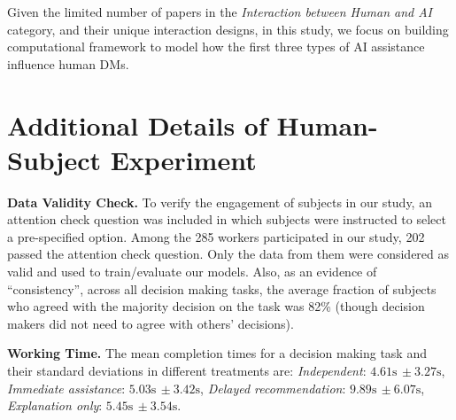 \documentclass[letterpaper]{article} %
\begin{document}
Given the limited number of papers in the \emph{Interaction between Human and AI} category, and their unique interaction designs, in this study, we focus on building computational framework to model how the first three types of AI assistance influence human DMs. 


\section{Additional Details of Human-Subject Experiment}
\noindent \textbf{Data Validity Check.} To verify the engagement of subjects in our study, an attention check question was included in which subjects were instructed to select a pre-specified option. Among the 285 workers participated in our study, 202 passed the attention check question. Only the data from them were considered as valid and used to train/evaluate our models. Also, as an evidence of ``consistency'', across all decision making tasks, the average fraction of subjects who agreed with the majority decision on the task was 82\% (though decision makers did not need to agree with others' decisions).

\vspace{2pt}
\noindent \textbf{Working Time.} The mean  completion times for a decision making task and their standard deviations in different treatments are: {\em Independent}: $4.61 \text{s} \, \pm 3.27 \text{s}$, {\em Immediate assistance}: $5.03 \text{s} \, \pm 3.42 \text{s}$, {\em Delayed recommendation}:  $9.89 \text{s} \, \pm 6.07 \text{s}$, {\em Explanation only}:   $5.45 \text{s} \, \pm 3.54 \text{s}$. 

\begin{table}[t]

\centering
{}
\caption{Comparing  the performance of our method against an alternative that substitutes the distribution of decision model $q_{\phi}(\bm{w}_h)$ of our method  with a deterministic logistic regression model in the \emph{Delayed recommendation} scenario. NLL is adopted as the evaluation metric, with a lower NLL denoting superior performance.
}
\label{tab:ablation}
\end{table}
\end{document}
